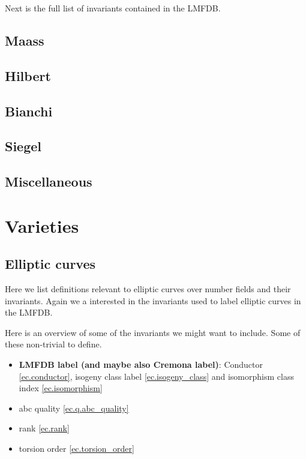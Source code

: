 Next is the full list of invariants contained in the LMFDB.



\section{Maass}


\section{Hilbert}


\section{Bianchi}


\section{Siegel}


\section{Miscellaneous}


\chapter{Varieties}

\section{Elliptic curves}
Here we list definitions relevant to elliptic curves over number fields and their invariants.
Again we a interested in the invariants used to label elliptic curves in the LMFDB.

Here is an overview of some of the invariants we might want to include. Some of these non-trivial to define.

\begin{itemize}
    \item \textbf{LMFDB label (and maybe also Cremona label)}: Conductor \ref{ec.conductor},
      isogeny class label \ref{ec.isogeny_class} and isomorphism class index \ref{ec.isomorphism}
    \item abc quality \ref{ec.q.abc_quality}
    \item rank \ref{ec.rank}
    \item torsion order \ref{ec.torsion_order}
\end{itemize}

